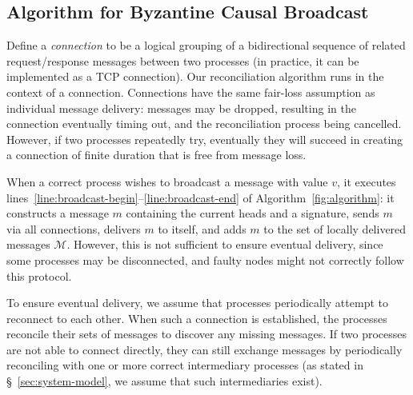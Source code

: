 \documentclass[a4paper,anonymous,USenglish]{lipics-v2019}
\begin{document}
\subsection{Algorithm for Byzantine Causal Broadcast}\label{sec:algorithm1}

Define a \emph{connection} to be a logical grouping of a bidirectional sequence of related request/response messages between two processes (in practice, it can be implemented as a TCP connection).
Our reconciliation algorithm runs in the context of a connection.
Connections have the same fair-loss assumption as individual message delivery: messages may be dropped, resulting in the connection eventually timing out, and the reconciliation process being cancelled.
However, if two processes repeatedly try, eventually they will succeed in creating a connection of finite duration that is free from message loss.

When a correct process wishes to broadcast a message with value $v$, it executes lines~\ref{line:broadcast-begin}--\ref{line:broadcast-end} of Algorithm~\ref{fig:algorithm}: it constructs a message $m$ containing the current heads and a signature, sends $m$ via all connections, delivers $m$ to itself, and adds $m$ to the set of locally delivered messages $\mathcal{M}$.
However, this is not sufficient to ensure eventual delivery, since some processes may be disconnected, and faulty nodes might not correctly follow this protocol.

To ensure eventual delivery, we assume that processes periodically attempt to reconnect to each other.
When such a connection is established, the processes reconcile their sets of messages to discover any missing messages.
If two processes are not able to connect directly, they can still exchange messages by periodically reconciling with one or more correct intermediary processes (as stated in \S~\ref{sec:system-model}, we assume that such intermediaries exist).
\end{document}
